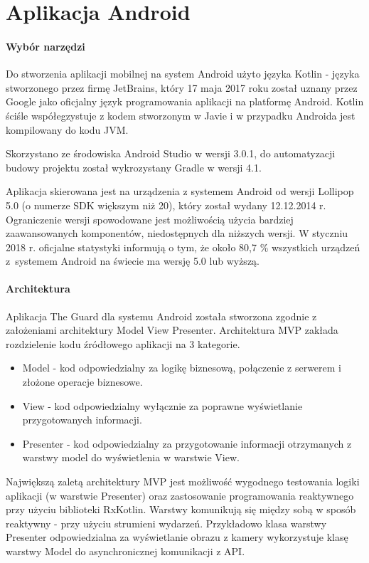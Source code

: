 \section{Aplikacja Android}
\paragraph{Wybór narzędzi} Do stworzenia aplikacji mobilnej na system Android użyto języka Kotlin - języka stworzonego przez firmę JetBrains, który 17 maja 2017 roku został uznany przez Google jako oficjalny język programowania aplikacji na platformę Android.\cite{google-kotlin}
Kotlin ściśle współegzystuje z kodem stworzonym w Javie i w przypadku Androida jest kompilowany do kodu JVM.\cite{KOTLIN}

Skorzystano ze środowiska Android Studio w wersji 3.0.1, do automatyzacji budowy projektu został wykrozystany Gradle w wersji 4.1.

Aplikacja skierowana jest na urządzenia z systemem Android od wersji Lollipop 5.0 (o numerze SDK większym niż 20), który został wydany 12.12.2014 r. Ograniczenie wersji spowodowane jest możliwością użycia bardziej zaawansowanych komponentów, niedostępnych dla niższych wersji. W styczniu 2018 r. oficjalne statystyki informują o tym, że około 80,7 \% wszystkich urządzeń z~systemem Android na świecie ma wersję 5.0 lub wyższą. \cite{android}

\paragraph{Architektura} Aplikacja The Guard dla systemu Android została stworzona zgodnie z założeniami architektury Model View Presenter.
Architektura MVP zakłada rozdzielenie kodu źródłowego aplikacji na 3 kategorie.
\begin{itemize}
\item Model - kod odpowiedzialny za logikę biznesową, połączenie z serwerem i złożone operacje biznesowe.
\item View - kod odpowiedzialny wyłącznie za poprawne wyświetlanie przygotowanych informacji.
\item Presenter - kod odpowiedzialny za przygotowanie informacji otrzymanych z warstwy model do wyświetlenia w warstwie View.
\end{itemize}
Największą zaletą architektury MVP jest możliwość wygodnego testowania logiki aplikacji (w warstwie Presenter) oraz zastosowanie programowania reaktywnego przy użyciu biblioteki RxKotlin.
Warstwy komunikują się między sobą w sposób reaktywny - przy użyciu strumieni wydarzeń.
Przykładowo klasa warstwy Presenter odpowiedzialna za wyświetlanie obrazu z kamery wykorzystuje klasę warstwy Model do asynchronicznej komunikacji z API.\cite{RXJAVA}


